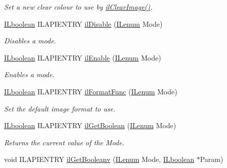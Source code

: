 \begin{DoxyCompactItemize}
\begin{DoxyCompactList}\small\item\em Set a new clear colour to use by \hyperlink{group__image__manip_gae48d76d54f6f00fe54b304c29224653f}{il\+Clear\+Image()}. \end{DoxyCompactList}\item 
\hyperlink{group__il__types_gaa6aa7c95cfdc06b4d8601ef832b7bb0a}{I\+Lboolean} I\+L\+A\+P\+I\+E\+N\+T\+R\+Y \hyperlink{group__state_ga4b5f72e2b4f6b197efed3a64646a6651}{il\+Disable} (\hyperlink{group__il__types_ga62ca73445716183ef42b1f3906a45ed0}{I\+Lenum} Mode)
\begin{DoxyCompactList}\small\item\em Disables a mode. \end{DoxyCompactList}\item 
\hyperlink{group__il__types_gaa6aa7c95cfdc06b4d8601ef832b7bb0a}{I\+Lboolean} I\+L\+A\+P\+I\+E\+N\+T\+R\+Y \hyperlink{group__state_gafa976322d840e3ffa8e0076ecff51b2b}{il\+Enable} (\hyperlink{group__il__types_ga62ca73445716183ef42b1f3906a45ed0}{I\+Lenum} Mode)
\begin{DoxyCompactList}\small\item\em Enables a mode. \end{DoxyCompactList}\item 
\hyperlink{group__il__types_gaa6aa7c95cfdc06b4d8601ef832b7bb0a}{I\+Lboolean} I\+L\+A\+P\+I\+E\+N\+T\+R\+Y \hyperlink{group__state_gacc97a458c5ba4562e32f0e8c446b3106}{il\+Format\+Func} (\hyperlink{group__il__types_ga62ca73445716183ef42b1f3906a45ed0}{I\+Lenum} Mode)
\begin{DoxyCompactList}\small\item\em Set the default image format to use. \end{DoxyCompactList}\item 
\hypertarget{group__state_ga57d539fb2bdaacd8c6eec5d7e732e6e3}{\hyperlink{group__il__types_gaa6aa7c95cfdc06b4d8601ef832b7bb0a}{I\+Lboolean} I\+L\+A\+P\+I\+E\+N\+T\+R\+Y \hyperlink{group__state_ga57d539fb2bdaacd8c6eec5d7e732e6e3}{il\+Get\+Boolean} (\hyperlink{group__il__types_ga62ca73445716183ef42b1f3906a45ed0}{I\+Lenum} Mode)}\label{group__state_ga57d539fb2bdaacd8c6eec5d7e732e6e3}

\begin{DoxyCompactList}\small\item\em Returns the current value of the {\itshape Mode}. \end{DoxyCompactList}\item 
\hypertarget{group__state_ga4f52565d3e790d84e8a42b143446383e}{void I\+L\+A\+P\+I\+E\+N\+T\+R\+Y \hyperlink{group__state_ga4f52565d3e790d84e8a42b143446383e}{il\+Get\+Booleanv} (\hyperlink{group__il__types_ga62ca73445716183ef42b1f3906a45ed0}{I\+Lenum} Mode, \hyperlink{group__il__types_gaa6aa7c95cfdc06b4d8601ef832b7bb0a}{I\+Lboolean} $\ast$Param)}\label{group__state_ga4f52565d3e790d84e8a42b143446383e}


\end{DoxyCompactItemize}
